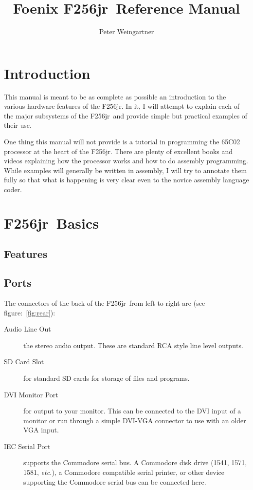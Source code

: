 \documentclass[oneside]{book}
\newcommand{\jr}{F256jr}
\begin{document}
\title{Foenix \jr\ Reference Manual}
\author{Peter Weingartner}
\maketitle

\tableofcontents
\listoftables

\chapter{Introduction}

This manual is meant to be as complete as possible an introduction to the various hardware features of the \jr. In it, I will attempt to explain each of the major subsystems of the \jr\ and provide simple but practical examples of their use.

One thing this manual will not provide is a tutorial in programming the 65C02 processor at the heart of the \jr. There are plenty of excellent books and videos explaining how the processor works and how to do assembly programming. While examples will generally be written in assembly, I will try to annotate them fully so that what is happening is very clear even to the novice assembly language coder.

\chapter{\jr\ Basics}

\section{Features}

\section{Ports}

The connectors of the back of the \jr\ from left to right are (see figure:~\ref{fig:rear}):

\begin{description}
    \item[Audio Line Out] the stereo audio output. These are standard RCA style line level outputs.

    \item[SD Card Slot] for standard SD cards for storage of files and programs.

    \item[DVI Monitor Port] for output to your monitor. This can be connected to the DVI input of a monitor or run through a simple DVI-VGA connector to use with an older VGA input.

    \item[IEC Serial Port] supports the Commodore serial bus. A Commodore disk drive (1541, 1571, 1581, {\it etc.}), a Commodore compatible serial printer, or other device supporting the Commodore serial bus can be connected here.
\end{description}
\end{document}
